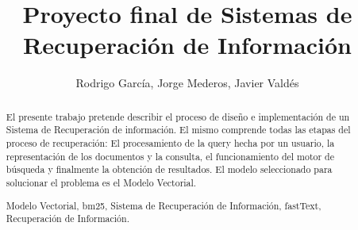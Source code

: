 \documentclass[runningheads,a4paper]{llncs}
\newcommand{\keywords}[1]{\par\addvspace\baselineskip
\noindent\keywordname\enspace\ignorespaces#1}
\begin{document}
\mainmatter  %

\title{Proyecto final de Sistemas de Recuperación de Información}


%
%
\author{Rodrigo García, Jorge Mederos, Javier Valdés}
%


%
%

\maketitle


\begin{abstract}
El presente trabajo pretende describir el proceso de diseño e implementación de un Sistema de Recuperación de información. El mismo comprende todas las etapas del proceso de recuperación: El procesamiento de la query hecha por un usuario, la representación de los documentos y la consulta, el funcionamiento del motor de búsqueda y finalmente la obtención de resultados. El modelo seleccionado para solucionar el problema es el Modelo Vectorial.
\keywords{Modelo Vectorial, bm25, Sistema de Recuperación de Información, fastText, Recuperación de Información.}
\end{abstract}
\end{document}
